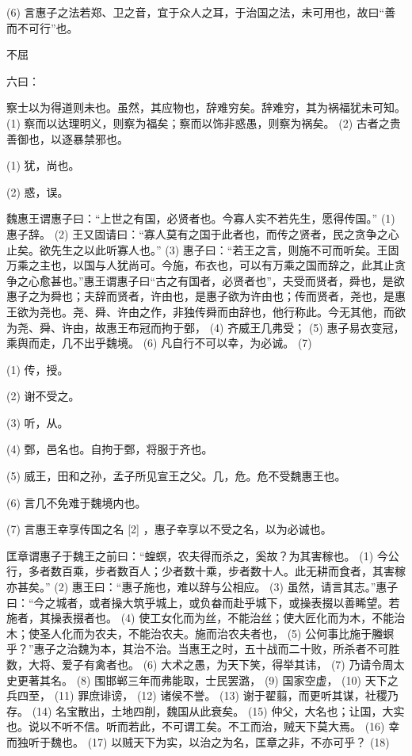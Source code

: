 \documentclass[12pt,UTF8]{ctexbook}
\begin{document}
(6) 言惠子之法若郑、卫之音，宜于众人之耳，于治国之法，未可用也，故曰“善而不可行”也。





不屈


六曰：

察士以为得道则未也。虽然，其应物也，辞难穷矣。辞难穷，其为祸福犹未可知。 (1) 察而以达理明义，则察为福矣；察而以饰非惑愚，则察为祸矣。 (2) 古者之贵善御也，以逐暴禁邪也。

(1) 犹，尚也。

(2) 惑，误。

魏惠王谓惠子曰：“上世之有国，必贤者也。今寡人实不若先生，愿得传国。” (1) 惠子辞。 (2) 王又固请曰：“寡人莫有之国于此者也，而传之贤者，民之贪争之心止矣。欲先生之以此听寡人也。” (3) 惠子曰：“若王之言，则施不可而听矣。王固万乘之主也，以国与人犹尚可。今施，布衣也，可以有万乘之国而辞之，此其止贪争之心愈甚也。”惠王谓惠子曰“古之有国者，必贤者也”，夫受而贤者，舜也，是欲惠子之为舜也；夫辞而贤者，许由也，是惠子欲为许由也；传而贤者，尧也，是惠王欲为尧也。尧、舜、许由之作，非独传舜而由辞也，他行称此。今无其他，而欲为尧、舜、许由，故惠王布冠而拘于鄄， (4) 齐威王几弗受； (5) 惠子易衣变冠，乘舆而走，几不出乎魏境。 (6) 凡自行不可以幸，为必诚。 (7)

(1) 传，授。

(2) 谢不受之。

(3) 听，从。

(4) 鄄，邑名也。自拘于鄄，将服于齐也。

(5) 威王，田和之孙，孟子所见宣王之父。几，危。危不受魏惠王也。

(6) 言几不免难于魏境内也。

(7) 言惠王幸享传国之名 [2] ，惠子幸享以不受之名，以为必诚也。

匡章谓惠子于魏王之前曰：“蝗螟，农夫得而杀之，奚故？为其害稼也。 (1) 今公行，多者数百乘，步者数百人；少者数十乘，步者数十人。此无耕而食者，其害稼亦甚矣。” (2) 惠王曰：“惠子施也，难以辞与公相应。 (3) 虽然，请言其志。”惠子曰：“今之城者，或者操大筑乎城上，或负畚而赴乎城下，或操表掇以善睎望。若施者，其操表掇者也。 (4) 使工女化而为丝，不能治丝；使大匠化而为木，不能治木；使圣人化而为农夫，不能治农夫。施而治农夫者也， (5) 公何事比施于螣螟乎？”惠子之治魏为本，其治不治。当惠王之时，五十战而二十败，所杀者不可胜数，大将、爱子有禽者也。 (6) 大术之愚，为天下笑，得举其讳， (7) 乃请令周太史更著其名。 (8) 围邯郸三年而弗能取，士民罢潞， (9) 国家空虚， (10) 天下之兵四至， (11) 罪庶诽谤， (12) 诸侯不誉。 (13) 谢于翟翦，而更听其谋，社稷乃存。 (14) 名宝散出，土地四削，魏国从此衰矣。 (15) 仲父，大名也；让国，大实也。说以不听不信。听而若此，不可谓工矣。不工而治，贼天下莫大焉。 (16) 幸而独听于魏也。 (17) 以贼天下为实，以治之为名，匡章之非，不亦可乎？ (18)
\end{document}
